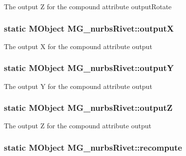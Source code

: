 The output Z for the compound attribute output\-Rotate \hypertarget{class_m_g__nurbs_rivet_a4166483abd2b8b57483d81dbc97f3de5}{
\subsubsection[{output\-X}]{\setlength{\rightskip}{0pt plus 5cm}static M\-Object M\-G\-\_\-nurbs\-Rivet\-::output\-X\hspace{0.3cm}{\ttfamily [static]}}}\label{class_m_g__nurbs_rivet_a4166483abd2b8b57483d81dbc97f3de5}
The output X for the compound attribute output \hypertarget{class_m_g__nurbs_rivet_a9dacbb8116714802ee9eb28176a1e38c}{
\subsubsection[{output\-Y}]{\setlength{\rightskip}{0pt plus 5cm}static M\-Object M\-G\-\_\-nurbs\-Rivet\-::output\-Y\hspace{0.3cm}{\ttfamily [static]}}}\label{class_m_g__nurbs_rivet_a9dacbb8116714802ee9eb28176a1e38c}
The output Y for the compound attribute output \hypertarget{class_m_g__nurbs_rivet_a923a0bc4a7e64e2a6179e7d55cffd2a9}{
\subsubsection[{output\-Z}]{\setlength{\rightskip}{0pt plus 5cm}static M\-Object M\-G\-\_\-nurbs\-Rivet\-::output\-Z\hspace{0.3cm}{\ttfamily [static]}}}\label{class_m_g__nurbs_rivet_a923a0bc4a7e64e2a6179e7d55cffd2a9}
The output Z for the compound attribute output \hypertarget{class_m_g__nurbs_rivet_a7aeccbeeb51f51b5bef973f01103e6b9}{
\subsubsection[{recompute}]{\setlength{\rightskip}{0pt plus 5cm}static M\-Object M\-G\-\_\-nurbs\-Rivet\-::recompute\hspace{0.3cm}{\ttfamily [static]}}}\label{class_m_g__nurbs_rivet_a7aeccbeeb51f51b5bef973f01103e6b9}
